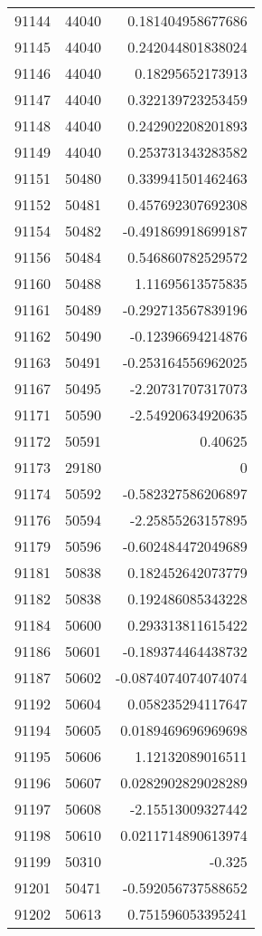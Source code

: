 \begin{tabular}{r | r | r}
91144 & 44040 & 0.181404958677686 \\
91145 & 44040 & 0.242044801838024 \\
91146 & 44040 & 0.18295652173913 \\
91147 & 44040 & 0.322139723253459 \\
91148 & 44040 & 0.242902208201893 \\
91149 & 44040 & 0.253731343283582 \\
91151 & 50480 & 0.339941501462463 \\
91152 & 50481 & 0.457692307692308 \\
91154 & 50482 & -0.491869918699187 \\
91156 & 50484 & 0.546860782529572 \\
91160 & 50488 & 1.11695613575835 \\
91161 & 50489 & -0.292713567839196 \\
91162 & 50490 & -0.12396694214876 \\
91163 & 50491 & -0.253164556962025 \\
91167 & 50495 & -2.20731707317073 \\
91171 & 50590 & -2.54920634920635 \\
91172 & 50591 & 0.40625 \\
91173 & 29180 & 0 \\
91174 & 50592 & -0.582327586206897 \\
91176 & 50594 & -2.25855263157895 \\
91179 & 50596 & -0.602484472049689 \\
91181 & 50838 & 0.182452642073779 \\
91182 & 50838 & 0.192486085343228 \\
91184 & 50600 & 0.293313811615422 \\
91186 & 50601 & -0.189374464438732 \\
91187 & 50602 & -0.0874074074074074 \\
91192 & 50604 & 0.058235294117647 \\
91194 & 50605 & 0.0189469696969698 \\
91195 & 50606 & 1.12132089016511 \\
91196 & 50607 & 0.0282902829028289 \\
91197 & 50608 & -2.15513009327442 \\
91198 & 50610 & 0.0211714890613974 \\
91199 & 50310 & -0.325 \\
91201 & 50471 & -0.592056737588652 \\
91202 & 50613 & 0.751596053395241 \\

\end{tabular}
